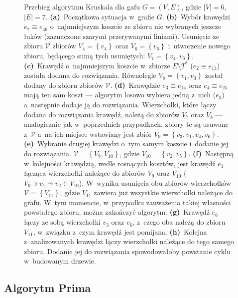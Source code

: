 \begin{figure}[!htbp]
\begin{subfigure}[b]{0.19\textwidth}
		\caption{}
		\label{fig:kruskal:h}
	\end{subfigure}
	\caption{
		Przebieg algorytmu Kruskala dla gafu $G = \left( V, E \right)$, gdzie $\left| V \right| = 6$, $\left| E \right| = 7$.
		\textbf{(a)}~Początkowa sytuacja w~grafie $G$.
		\textbf{(b)}~Wybór krawędzi $e_{7} \equiv e_{46}$ o~najmniejszym koszcie ze zbioru nie wybranych jeszcze łuków (zaznaczone szarymi przerywanymi liniami).
		Usunięcie ze zbioru $\mathcal{V}$ zbiorów $V_{4} = \left\{ v_{4} \right\}$ oraz $V_{6} = \left\{ v_{6} \right\}$ i~utworzenie nowego zbioru, będącego sumą tych usuniętych: $V_{7} = \left\{ v_{4}, v_{6} \right\}$.
		\textbf{(c)}~Krawędź o~najmniejszym koszcie w~zbiorze $E \setminus T^{\ast}$ ($e_{2} \equiv e_{13}$) została dodana do rozwiązania.
		Równolegle $V_{8} = \left\{ v_{1}, v_{3} \right\}$ został dodany do zbioru zbiorów $\mathcal{V}$.
		\textbf{(d)}~Krawędzie $e_{3} \equiv e_{14}$ oraz $e_{4} \equiv e_{25}$ mają ten sam koszt --- algorytm losowo wybiera jedną z~nich ($e_{3}$) a~następnie dodaje ją do rozwiązania.
		Wierzchołki, które łączy dodana do rozwiązania krawędź, należą do zbiorów $V_{7}$ oraz $V_{8}$ --- analogicznie jak w~poprzednich przypadkach, zbiory te są usuwane z~$\mathcal{V}$ a~na ich miejsce wstawiany jest zbiór $V_{9} = \left\{ v_{3}, v_{1}, v_{4}, v_{6} \right\}$.
		\textbf{(e)}~Wybranie drugiej krawędzi o~tym samym koszcie i~dodanie jej do rozwiązania.
		$\mathcal{V} = \left\{ V_{9}, V_{10} \right\}$, gdzie $V_{10} = \left\{ v_{2}, v_{5} \right\}$.
		\textbf{(f)}~Następną w~kolejności krawędzią, wedle rosnących kosztów, jest krawędź $e_{1}$ łącząca wierzchołki należące do zbiorów $V_{9}$ oraz $V_{10}$ ($V_{9} \ni v_{1} \leadsto v_{2} \in V_{10}$).
		W~wyniku usunięcia obu zbiorów wierzchołków $\mathcal{V} = \left\{ V_{11} \right\}$, gdzie $V_{11}$ zawiera już wszystkie wierzchołki należące do grafu.
		W~tym momencie, w~przypadku zauważenia takiej własności powstałego zbioru, można zakończyć algorytm.
		\textbf{(g)}~Krawędź $e_{6}$ łączy ze sobą wierzchołki $v_{3}$ oraz $v_{6}$, z~czego oba należą do zbioru $V_{11}$, w~związku z~czym krawędź jest pomijana.
		\textbf{(h)}~Kolejna z~analizowanych krawędzi łączy wierzchołki należące do tego samego zbioru.
		Dodanie jej do rozwiązania spowodowałoby powstanie cyklu w~budowanym drzewie.
	}
	\label{fig:kruskal}
\end{figure}



\subsection{Algorytm Prima}



